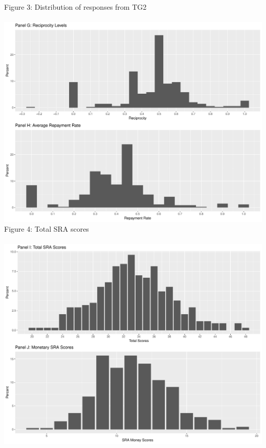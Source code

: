 \documentclass[12pt]{article}
\begin{document}
\noindent Figure 3: Distribution of responses from TG2 \\ \\
\includegraphics[scale=0.4]{Figure2c.pdf} \\



\noindent Figure 4: Total SRA scores\\ \\
\includegraphics[scale=0.4]{Figure3.pdf}\\
\end{document}
